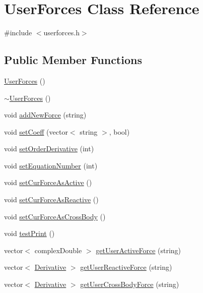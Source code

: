 \hypertarget{class_user_forces}{\section{User\-Forces Class Reference}
\label{class_user_forces}
}


{\ttfamily \#include $<$userforces.\-h$>$}

\subsection*{Public Member Functions}
\begin{DoxyCompactItemize}
\item 
\hyperlink{class_user_forces_a642cb07c929ac7431ba9b9bd1cf62487}{User\-Forces} ()
\item 
\hyperlink{class_user_forces_aae54a625e8d3a753b108c47e543a9b3c}{$\sim$\-User\-Forces} ()
\item 
void \hyperlink{class_user_forces_af4543aab611d78a96c2c3ccd8a182c43}{add\-New\-Force} (string)
\item 
void \hyperlink{class_user_forces_a5e91ea4efcb7bfea69fac4707b0f7523}{set\-Coeff} (vector$<$ string $>$, bool)
\item 
void \hyperlink{class_user_forces_ac9af0ed1756485df7f1c20434a419430}{set\-Order\-Derivative} (int)
\item 
void \hyperlink{class_user_forces_a701bdb1ef5b9b9d323a3064d57009073}{set\-Equation\-Number} (int)
\item 
void \hyperlink{class_user_forces_acf637eb58f211a30292a56579523c8b6}{set\-Cur\-Force\-As\-Active} ()
\item 
void \hyperlink{class_user_forces_a9ef4176430e8ac2f087277f4fe359a85}{set\-Cur\-Force\-As\-Reactive} ()
\item 
void \hyperlink{class_user_forces_aeee89b5918595cdc8e573e634bc48e29}{set\-Cur\-Force\-As\-Cross\-Body} ()
\item 
void \hyperlink{class_user_forces_ab5af72b01b05992885c2f32f924103dc}{test\-Print} ()
\item 
vector$<$ complex\-Double $>$ \hyperlink{class_user_forces_a972c3378118f3ebce036a5be3914657b}{get\-User\-Active\-Force} (string)
\item 
vector$<$ \hyperlink{class_derivative}{Derivative} $>$ \hyperlink{class_user_forces_adb47c57e211381745905ad88831a30ac}{get\-User\-Reactive\-Force} (string)
\item 
vector$<$ \hyperlink{class_derivative}{Derivative} $>$ \hyperlink{class_user_forces_a234c94ba061fcfff579fb1dd8bc1a47d}{get\-User\-Cross\-Body\-Force} (string)
\end{DoxyCompactItemize}


